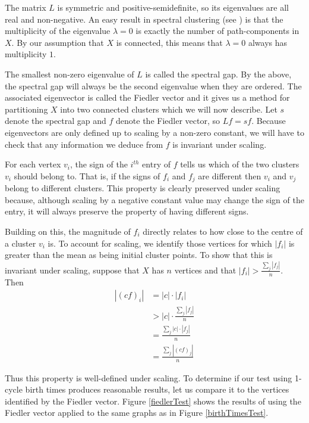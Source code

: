 \documentclass[12pt,a4paper]{amsart}
\numberwithin{equation}{section}
\def\l{\lambda}
\theoremstyle{plain}
\theoremstyle{definition}
\begin{document}
The matrix $L$ is symmetric and positive-semidefinite, so its eigenvalues are all real and non-negative. An easy result in spectral clustering (see \cite{fiedler}) is that the multiplicity of the eigenvalue $\l = 0$ is exactly the number of path-components in $X$. By our assumption that $X$ is connected, this means that $\l = 0$ always has multiplicity $1$.

The smallest non-zero eigenvalue of $L$ is called the spectral gap. By the above, the spectral gap will always be the second eigenvalue when they are ordered. The associated eigenvector is called the Fiedler vector and it gives us a method for partitioning $X$ into two connected clusters which we will now describe. Let $s$ denote the spectral gap and $f$ denote the Fiedler vector, so $Lf = sf$. Because eigenvectors are only defined up to scaling by a non-zero constant, we will have to check that any information we deduce from $f$ is invariant under scaling. 

For each vertex $v_i$, the sign of the $i^{th}$ entry of $f$ tells us which of the two clusters $v_i$ should belong to. That is, if the signs of $f_i$ and $f_j$ are different then $v_i$ and $v_j$ belong to different clusters. This property is clearly preserved under scaling because, although scaling by a negative constant value may change the sign of the entry, it will always preserve the property of having different signs.

Building on this, the magnitude of $f_i$ directly relates to how close to the centre of a cluster $v_i$ is. To account for scaling, we identify those vertices for which $|f_i|$ is greater than the mean as being initial cluster points. To show that this is invariant under scaling, suppose that $X$ has $n$ vertices and that $|f_i| > \frac{\sum_j |f_j|}{n}$. Then
\begin{align*}
|(cf)_i| &= |c| \cdot |f_i| \\
&> |c| \cdot \frac{\sum_j |f_j|}{n} \\
&= \frac{\sum_j|c| \cdot |f_j|}{n} \\
&= \frac{\sum_j |(cf)_j|}{n}
\end{align*}

Thus this property is well-defined under scaling. To determine if our test using 1-cycle birth times produces reasonable results, let us compare it to the vertices identified by the Fiedler vector. Figure \ref{fiedlerTest} shows the results of using the Fiedler vector applied to the same graphs as in Figure \ref{birthTimesTest}. 
\end{document}
